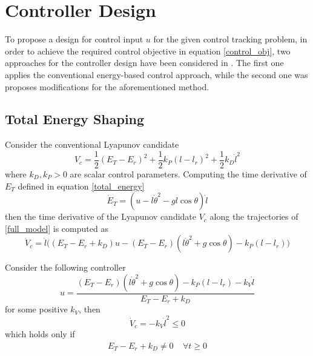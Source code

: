 \documentclass[main.tex]{subfiles}
\begin{document}
\section{Controller Design}
\label{sec:controller-design}
To propose a design for control input $u$ for the given control tracking problem, in order to achieve the required control objective in equation \eqref{control_obj}, two approaches for the controller design have been considered in \cite{xin2014control}. The first one applies the conventional energy-based control approach, while the second one was proposes modifications for the aforementioned method.
\subsection{Total Energy Shaping}
Consider the conventional Lyapunov candidate
\begin{equation}
    V_c = \frac{1}{2}(E_T-E_r)^2+\frac{1}{2}k_P(l-l_r)^2+\frac{1}{2}k_D\dot{l}^2
\end{equation}
where $k_D,k_P > 0$ are scalar control parameters. Computing the time derivative of $E_T$ defined in equation \eqref{total_energy}
\begin{equation}\label{energy_dot}
    \dot{E}_T = (u-l\dot{\theta}^2-gl\cos\theta)\dot{l}
\end{equation}
then the time derivative of the Lyapunov candidate $V_c$ along the trajectories of \eqref{full_model} is computed as
\begin{equation}
    \dot{V}_c = \dot{l}\big((E_T-E_r+k_D)u-(E_T-E_r)(l\dot{\theta}^2+g\cos\theta)-k_P(l-l_r) \big)
\end{equation}
 
Consider the following controller
\begin{equation}
\label{eq:tot-mech-energy-controller}
    u = \frac{(E_T-E_r)(l\dot{\theta}^2+g\cos\theta)-k_P(l-l_r)-k_V\dot{l}}{E_T-E_r+k_D}
\end{equation}
 for some positive $k_V$, then 
 \begin{equation}
     \dot{V}_c = -k_V\dot{l}^2 \leq 0
 \end{equation}
which holds only if
 \begin{eqnarray}
    E_T-E_r+k_D  \neq 0 \ \ \ \ \  	\forall t\geq 0
 \end{eqnarray}

\end{document}
